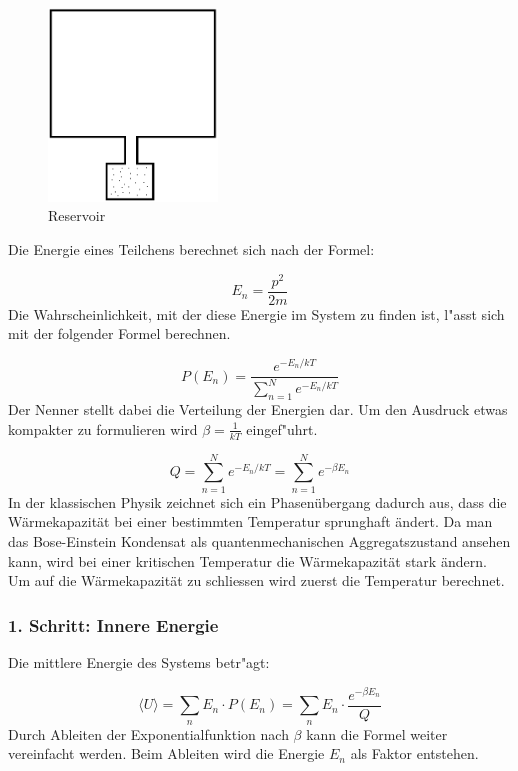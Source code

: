 \begin{refsection}
\begin{figure}
	\centering
	\includegraphics[width = 0.4\textwidth]{./bose/reservoir.png}
	\caption{Reservoir}
	\label{fig:reservoir}
\end{figure}
Die Energie eines Teilchens berechnet sich nach der Formel:

\begin{equation}
   E_n = \frac{p^2}{2m}
\end{equation}
Die Wahrscheinlichkeit, mit der diese Energie im System zu finden ist, l"asst sich mit der folgender Formel berechnen.

\begin{equation}
    P(E_n) = \frac{e^{-E_n/kT}}{\sum\limits_{n = 1}^{N} e^{-E_n/kT}}    
\end{equation}
Der Nenner stellt dabei die Verteilung der Energien dar. Um den Ausdruck etwas kompakter zu formulieren wird $ \beta = \frac{1}{kT}$ eingef"uhrt.

\begin{equation}
    Q = \sum\limits_{n = 1}^{N} e^{-E_n/kT} = \sum\limits_{n = 1}^{N} e^{-\beta E_n}
\end{equation}
In der klassischen Physik zeichnet sich ein Phasenübergang dadurch aus, dass die Wärmekapazität bei einer bestimmten Temperatur sprunghaft ändert. Da man das Bose-Einstein Kondensat als quantenmechanischen Aggregatszustand ansehen kann, wird bei einer kritischen Temperatur die Wärmekapazität stark ändern. Um auf die Wärmekapazität zu schliessen wird zuerst die Temperatur berechnet.

\subsubsection{1. Schritt: Innere Energie}

Die mittlere Energie des Systems betr"agt:

\begin{equation}
    \langle U \rangle = \sum_{n} E_n \cdot P(E_n) = \sum_{n} E_n \cdot \frac{e^{-\beta E_n}}{Q}
\end{equation}
Durch Ableiten der Exponentialfunktion nach $\beta$ kann die Formel weiter vereinfacht werden. Beim Ableiten wird die Energie $E_n$ als Faktor entstehen.


\end{refsection}
